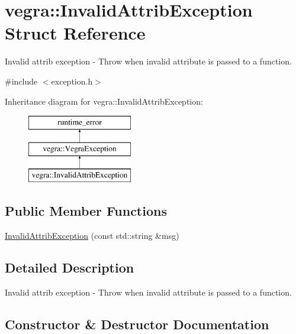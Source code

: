 \hypertarget{structvegra_1_1InvalidAttribException}{}\section{vegra\+:\+:Invalid\+Attrib\+Exception Struct Reference}
\label{structvegra_1_1InvalidAttribException}


Invalid attrib exception -\/ Throw when invalid attribute is passed to a function.  




{\ttfamily \#include $<$exception.\+h$>$}

Inheritance diagram for vegra\+:\+:Invalid\+Attrib\+Exception\+:\begin{figure}[H]
\begin{center}
\leavevmode
\includegraphics[height=3.000000cm]{structvegra_1_1InvalidAttribException}
\end{center}
\end{figure}
\subsection*{Public Member Functions}
\begin{DoxyCompactItemize}
\item 
\mbox{\hyperlink{structvegra_1_1InvalidAttribException_a919670428f8052ce5814b9665d6d9838}{Invalid\+Attrib\+Exception}} (const std\+::string \&msg)
\end{DoxyCompactItemize}


\subsection{Detailed Description}
Invalid attrib exception -\/ Throw when invalid attribute is passed to a function. 

\subsection{Constructor \& Destructor Documentation}
\mbox{\label{structvegra_1_1InvalidAttribException_a919670428f8052ce5814b9665d6d9838}} 
